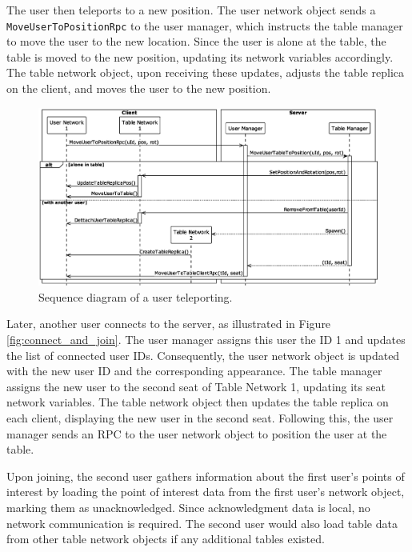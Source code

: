         The user then teleports to a new position. The user network object sends a \lstinline{MoveUserToPositionRpc} to the user manager, which instructs the table manager to move the user to the new location. Since the user is alone at the table, the table is moved to the new position, updating its network variables accordingly. The table network object, upon receiving these updates, adjusts the table replica on the client, and moves the user to the new position.

        \begin{figure}[h]
            \centering
            \includegraphics[width=.85\linewidth]{diagrams/out/teleport.eps}
            \caption{Sequence diagram of a user teleporting.}
            \label{fig:teleport}
        \end{figure}

        Later, another user connects to the server, as illustrated in Figure \ref{fig:connect_and_join}. The user manager assigns this user the ID 1 and updates the list of connected user IDs. Consequently, the user network object is updated with the new user ID and the corresponding appearance. The table manager assigns the new user to the second seat of Table Network 1, updating its seat network variables. The table network object then updates the table replica on each client, displaying the new user in the second seat. Following this, the user manager sends an RPC to the user network object to position the user at the table.

        Upon joining, the second user gathers information about the first user's points of interest by loading the point of interest data from the first user's network object, marking them as unacknowledged. Since acknowledgment data is local, no network communication is required. The second user would also load table data from other table network objects if any additional tables existed.

